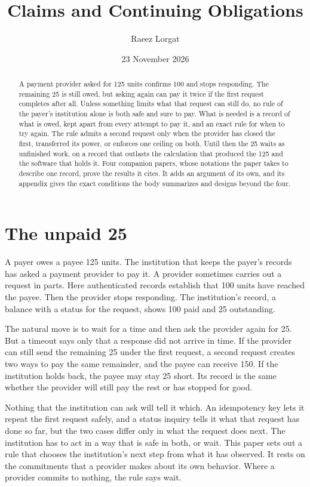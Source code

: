 \documentclass{momentum}
\title{Claims and Continuing Obligations}
\author{Raeez Lorgat}
\date{23 November 2026}
\begin{document}
\maketitle

\begin{abstract}
A payment provider asked for 125 units confirms 100 and stops responding. The remaining 25 is still owed, but asking again can pay it twice if the first request completes after all. Unless something limits what that request can still do, no rule of the payer's institution alone is both safe and sure to pay. What is needed is a record of what is owed, kept apart from every attempt to pay it, and an exact rule for when to try again. The rule admits a second request only when the provider has closed the first, transferred its power, or enforces one ceiling on both. Until then the 25 waits as unfinished work, on a record that outlasts the calculation that produced the 125 and the software that holds it. Four companion papers, whose notations the paper takes to describe one record, prove the results it cites. It adds an argument of its own, and its appendix gives the exact conditions the body summarizes and designs beyond the four.
\end{abstract}

\section{The unpaid 25}
\label{sec:payment}

A payer owes a payee 125 units. The institution that keeps the payer's records has asked a payment provider to pay it. A provider sometimes carries out a request in parts. Here authenticated records establish that 100 units have reached the payee. Then the provider stops responding. The institution's record, a balance with a status for the request, shows 100 paid and 25 outstanding.

The natural move is to wait for a time and then ask the provider again for 25. But a timeout says only that a response did not arrive in time. If the provider can still send the remaining 25 under the first request, a second request creates two ways to pay the same remainder, and the payee can receive 150. If the institution holds back, the payee may stay 25 short. Its record is the same whether the provider will still pay the rest or has stopped for good.

Nothing that the institution can ask will tell it which. An idempotency key lets it repeat the first request safely, and a status inquiry tells it what that request has done so far, but the two cases differ only in what the request does next. The institution has to act in a way that is safe in both, or wait. This paper sets out a rule that chooses the institution's next step from what it has observed. It rests on the commitments that a provider makes about its own behavior. Where a provider commits to nothing, the rule says wait.
\end{document}
